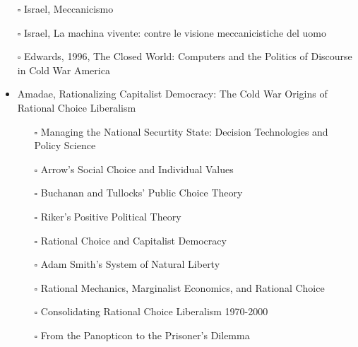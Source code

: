 \documentclass[paper=B6,portrait,twoside=true,twocolumn=false,headinclude=true,footinclude=false,fontsize=12,BCOR=10mm,DIV=calc,pagesize=auto,titlepage=firstiscover,mpinclude=false,headings=normal,headings=twolinechapter,open=right,toc=graduated,chapterprefix=false,numbers=endperiod,parskip=half+]{scrbook}
\theoremstyle{definition}
\begin{document}
\begin{itemize}
\item[{$\square$}] Israel,  Meccanicismo
\item[{$\square$}] Israel, La machina vivente: contre le visione meccanicistiche del uomo
\item[{$\square$}] Edwards, 1996, The Closed World: Computers and the Politics of Discourse in Cold War America
\item\relax [0/9] Amadae, Rationalizing Capitalist Democracy: The Cold War Origins of
Rational Choice Liberalism
\begin{itemize}
\item[{$\square$}] Managing the National Securtity State: Decision Technologies and Policy Science
\item[{$\square$}] Arrow's Social Choice and Individual Values
\item[{$\square$}] Buchanan and Tullocks' Public Choice Theory
\item[{$\square$}] Riker's Positive Political Theory
\item[{$\square$}] Rational Choice and Capitalist Democracy
\item[{$\square$}] Adam Smith's System of Natural Liberty
\item[{$\square$}] Rational Mechanics, Marginalist Economics, and Rational Choice
\item[{$\square$}] Consolidating Rational Choice Liberalism 1970-2000
\item[{$\square$}] From the Panopticon to the Prisoner's Dilemma
\end{itemize}
\end{itemize}
\end{document}
